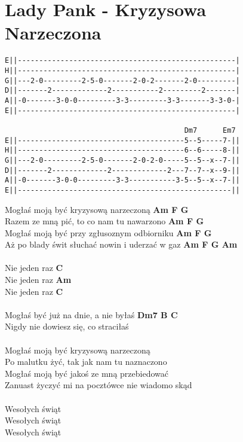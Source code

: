 \section{Lady Pank - Kryzysowa Narzeczona}
\begin{verbatim}
E||---------------------------------------------------|
H||---------------------------------------------------|
G||---2-0---------2-5-0-------2-0-2-------2-0---------|
D||-------2-------------2-----------2---------2-------|
A||-0-------3-0-0---------3-3---------3-3-------3-3-0-|
E||---------------------------------------------------|

                                          Dm7      Em7
E||---------------------------------------5--5-----7-||
H||---------------------------------------6--6-----8-||
G||---2-0---------2-5-0-------2-0-2-0-----5--5--x--7-||
D||-------2-------------2-------------2---7--7--x--9-||
A||-0-------3-0-0---------3-3-----------3-5--5--x--7-||
E||--------------------------------------------------||
\end{verbatim}
Mogłaś moją być kryzysową narzeczoną           \textbf{Am F G}\\
Razem ze mną pić, to co nam tu nawarzono       \textbf{Am F G}\\
Mogłaś moją być przy zgłusoznym odbiorniku     \textbf{Am F G}\\
Aż po blady świt słuchać nowin i uderzać w gaz \textbf{Am F G Am}\\
\\
Nie jeden raz \textbf{C}\\
Nie jeden raz \textbf{Am}\\
Nie jeden raz \textbf{C}\\
 \\
Mogłaś być już na dnie, a nie byłaś \textbf{Dm7 B C}\\
Nigdy nie dowiesz się, co straciłaś\\
 \\
Mogłaś moją być kryzysową narzeczoną                       \\
Po malutku żyć, tak jak nam tu naznaczono            \\
Mogłaś moją być jakoś ze mną przebiedować           \\
Zanuast życzyć mi na pocztówce nie wiadomo skąd    \\
 \\
Wesołych świąt      \\
Wesołych świąt   \\
Wesołych świąt      \\

